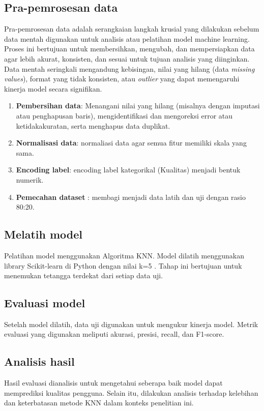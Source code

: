 \subsection{Pra-pemrosesan data}

\par Pra-pemrosesan data adalah serangkaian langkah krusial yang dilakukan sebelum data mentah digunakan untuk analisis atau pelatihan model machine learning. Proses ini bertujuan untuk membersihkan, mengubah, dan mempersiapkan data agar lebih akurat, konsisten, dan sesuai untuk tujuan analisis yang diinginkan. Data mentah seringkali mengandung kebisingan, nilai yang hilang (data \textit{missing values}), format yang tidak konsisten, atau \textit{outlier} yang dapat memengaruhi kinerja model secara signifikan. 

\begin{enumerate}
\item \textbf{Pembersihan data}: Menangani nilai yang hilang (misalnya dengan imputasi atau penghapusan baris), mengidentifikasi dan mengoreksi error atau ketidakakuratan, serta menghapus data duplikat.
   \item \textbf{Normalisasi data}: normaliasi data agar semua fitur memiliki skala yang sama.
   \item \textbf{Encoding label}: encoding label kategorikal (Kualitas) menjadi bentuk numerik.
   \item \textbf{Pemecahan dataset} : membagi menjadi data latih dan uji dengan rasio 80:20.
\end{enumerate}
 
\subsection{Melatih model}  

\par Pelatihan model menggunakan Algoritma KNN. Model dilatih menggunakan library Scikit-learn di Python dengan nilai k=5 . Tahap ini bertujuan untuk menemukan tetangga terdekat dari setiap data uji.

\subsection{Evaluasi model} 
\par Setelah model dilatih, data uji digunakan untuk mengukur kinerja model. Metrik evaluasi yang digunakan meliputi akurasi, presisi, recall, dan F1-score.


\subsection{Analisis hasil}
\par Hasil evaluasi dianalisis untuk mengetahui seberapa baik model dapat memprediksi kualitas pengguna. Selain itu, dilakukan analisis terhadap kelebihan dan keterbatasan metode KNN dalam konteks penelitian ini.

